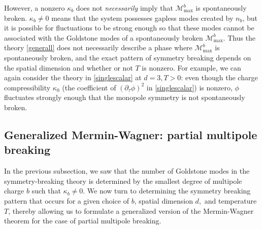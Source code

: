 \documentclass[pra,aps,twocolumn, amsfonts,amsmath,amssymb,nofootinbib,superscriptaddress]{revtex4-2}
\renewcommand{\max}{\text{max}}
\newcommand{\mmax}[1]{\mathcal{M}^{#1}_\max}
\newcommand{\p}{\partial}
\begin{document}
However, a nonzero $\kappa_b$ does not {\it necessarily} imply that $\mmax b$ is spontaneously broken. $\kappa_b\neq 0$ means that the system possesses gapless modes created by $n_b$, but it is possible for fluctuations to be strong enough so that these modes cannot be associated with the Goldstone modes of a spontaneously broken $\mmax b$. Thus the theory \eqref{generall} does not necessarily describe a phase where $\mmax b$ is spontaneously broken, and the exact pattern of symmetry breaking depends on the spatial dimension and whether or not $T$ is nonzero. For example, we can again consider the theory in \eqref{singlescalar} at $d=3, T>0$: even though the charge compressibility $\kappa_0$ (the coefficient of $(\p_\tau\phi)^2$ in \eqref{singlescalar}) is nonzero, $\phi$ fluctuates strongly enough that the monopole symmetry is not spontaneously broken.

	

\subsection{Generalized Mermin-Wagner: partial multipole breaking}

In the previous subsection, we saw that the number of Goldstone modes in the symmetry-breaking theory is determined by the smallest degree of multipole charge $b$ such that $\kappa_b\neq0$. We now turn to determining the symmetry breaking pattern that occurs for a given choice of $b$, spatial dimension $d,$ and temperature $T$, thereby allowing us to formulate a generalized version of the Mermin-Wagner theorem for the case of partial multipole breaking. 
\end{document}
